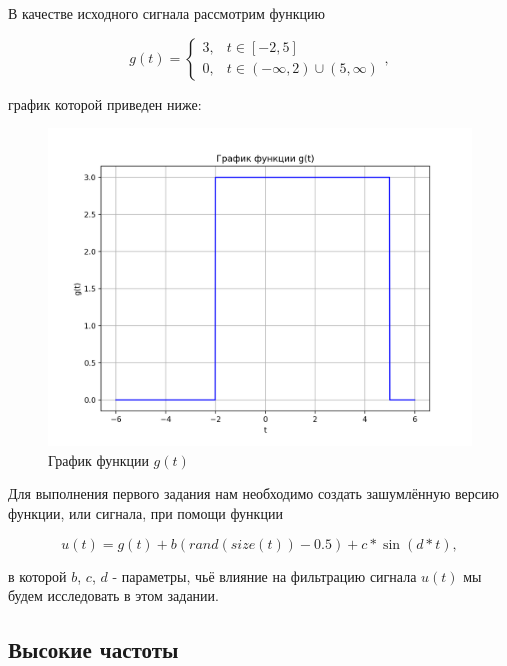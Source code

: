 В качестве исходного сигнала рассмотрим функцию

\begin{equation}
    g(t)=\begin{cases}
        3, & t \in [-2, 5] \\
        0, & t \in (-\infty,2)\cup (5,\infty)

    \end{cases},
\end{equation}

график которой приведен ниже:

\begin{figure}[ht!]
    \centering
    \includegraphics[width=\textwidth]{media/1 task/high_freq/Initial.png}
    \caption{График функции $g(t)$}
    \label{fig:initial}
\end{figure}

\clearpage

Для выполнения первого задания нам необходимо создать зашумлённую версию функции, или сигнала, при помощи функции

\begin{equation}
    u(t)=g(t)+b(rand(size(t))-0.5)+c*\sin(d*t),
\end{equation}

в которой $b$, $c$, $d$ - параметры, чьё влияние на фильтрацию сигнала $u(t)$ мы будем исследовать в этом задании.

\subsection{Высокие частоты}\label{high_freq}

